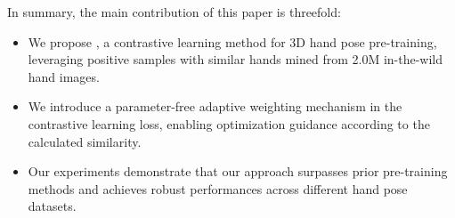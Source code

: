 In summary, the main contribution of this paper is threefold:
\vspace{-1mm}
\begin{itemize}[]
    \vspace{-1mm}
    \item We propose \Ours, a contrastive learning method for 3D hand pose pre-training, leveraging positive samples with similar hands mined from 2.0M in-the-wild hand images.
    \item We introduce a parameter-free adaptive weighting mechanism in the contrastive learning loss, enabling 
    optimization guidance according to the calculated similarity.
    \item Our experiments demonstrate that our approach surpasses prior pre-training methods and achieves robust performances across different hand pose datasets.
\end{itemize}